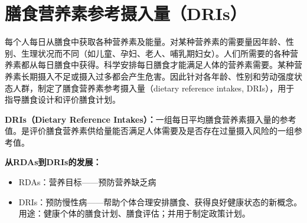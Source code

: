 \section{膳食营养素参考摄入量（DRIs）}\difficulty

每个人每日从膳食中获取各种营养素及能量。对某种营养素的需要量因年龄、性别、生理状况而不同（如儿童、孕妇、老人、哺乳期妇女）。人们所需要的各种营养素都从每日膳食中获得。科学安排每日膳食才能满足人体的营养素需要。某种营养素长期摄入不足或摄入过多都会产生危害。因此针对各年龄、性别和劳动强度状态人群，制定了膳食营养素参考摄入量（dietary reference intakes, DRIs），用于指导膳食设计和评价膳食计划。

\begin{defbox}
\textbf{DRIs（Dietary Reference Intakes）：}一组每日平均膳食营养素摄入量的参考值。是评价膳食营养素供给量能否满足人体需要及是否存在过量摄入风险的一组参考值。

\textbf{从RDAs到DRIs的发展：}
\begin{itemize}[leftmargin=*]
    \item RDAs：营养目标——预防营养缺乏病
    \item DRIs：预防慢性病——帮助个体合理安排膳食、获得良好健康状态的新概念。用途：健康个体的膳食计划、膳食评估；并用于制定政策计划。
\end{itemize}
\end{defbox}

